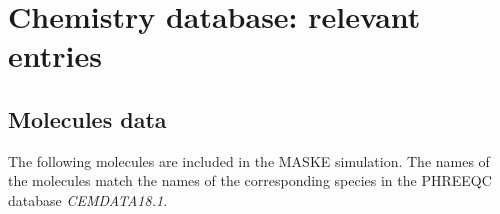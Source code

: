 \documentclass[12pt]{paper}    %
\begin{document}
\section{Chemistry database: relevant entries} 

\subsection{Molecules data}

The following molecules are included in the MASKE simulation. The names of the molecules match the names of the corresponding species in the PHREEQC database \textit{CEMDATA18.1}.
\end{document}
